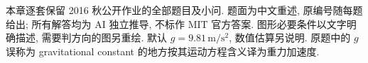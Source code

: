 \label{ch:assign}
本章逐套保留 2016 秋公开作业的全部题目及小问. 题面为中文重述, 原编号随每题给出; 所有解答均为 AI 独立推导, 不标作 MIT 官方答案. 图形必要条件以文字明确描述, 需要判方向的图另重绘. 默认 $g=9.81\,\mathrm{m/s^2}$, 数值估算另说明. 原题中的 $g$ 误称为 gravitational constant 的地方按其运动方程含义译为重力加速度.













